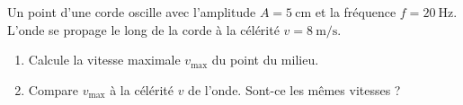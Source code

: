 \documentclass[11pt,a4paper]{article}
\begin{document}
\begin{exo}
Un point d'une corde oscille avec l'amplitude $A=\SI{5}{\centi\metre}$ et la fréquence
$f=\SI{20}{\hertz}$. L'onde se propage le long de la corde à la célérité $v=\SI{8}{\metre\per\second}$.
\begin{enumerate}[label=\alph*)]
  \item Calcule la vitesse maximale $v_{\max}$ du point du milieu.
  \item Compare $v_{\max}$ à la célérité $v$ de l'onde. Sont-ce les mêmes vitesses ?
\end{enumerate}
\end{exo}
\end{document}
